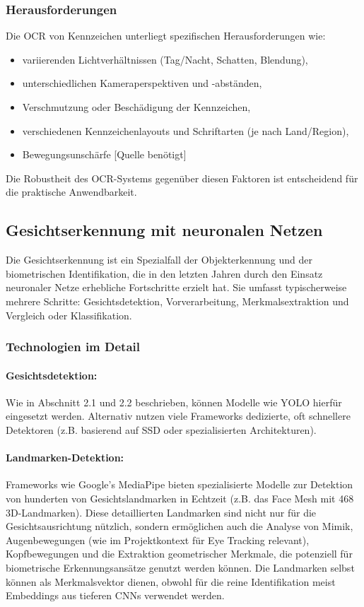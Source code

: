 \subsubsection{Herausforderungen}
Die OCR von Kennzeichen unterliegt spezifischen Herausforderungen wie:
\begin{itemize}
    \item variierenden Lichtverhältnissen (Tag/Nacht, Schatten, Blendung),
    \item unterschiedlichen Kameraperspektiven und -abständen,
    \item Verschmutzung oder Beschädigung der Kennzeichen,
    \item verschiedenen Kennzeichenlayouts und Schriftarten (je nach Land/Region),
    \item Bewegungsunschärfe [Quelle benötigt]
\end{itemize}

Die Robustheit des OCR-Systems gegenüber diesen Faktoren ist entscheidend für die praktische Anwendbarkeit.

\subsection{Gesichtserkennung mit neuronalen Netzen}

Die Gesichtserkennung ist ein Spezialfall der Objekterkennung und der biometrischen Identifikation, die in den letzten Jahren durch den Einsatz neuronaler Netze erhebliche Fortschritte erzielt hat. Sie umfasst typischerweise mehrere Schritte: Gesichtsdetektion, Vorverarbeitung, Merkmalsextraktion und Vergleich oder Klassifikation.

\subsubsection{Technologien im Detail}

\paragraph{Gesichtsdetektion:} 
Wie in Abschnitt 2.1 und 2.2 beschrieben, können Modelle wie YOLO hierfür eingesetzt werden. Alternativ nutzen viele Frameworks dedizierte, oft schnellere Detektoren (z.B. basierend auf SSD oder spezialisierten Architekturen).

\paragraph{Landmarken-Detektion:} 
Frameworks wie Google's MediaPipe bieten spezialisierte Modelle zur Detektion von hunderten von Gesichtslandmarken in Echtzeit (z.B. das Face Mesh mit 468 3D-Landmarken). Diese detaillierten Landmarken sind nicht nur für die Gesichtsausrichtung nützlich, sondern ermöglichen auch die Analyse von Mimik, Augenbewegungen (wie im Projektkontext für Eye Tracking relevant), Kopfbewegungen und die Extraktion geometrischer Merkmale, die potenziell für biometrische Erkennungsansätze genutzt werden können. Die Landmarken selbst können als Merkmalsvektor dienen, obwohl für die reine Identifikation meist Embeddings aus tieferen CNNs verwendet werden.

